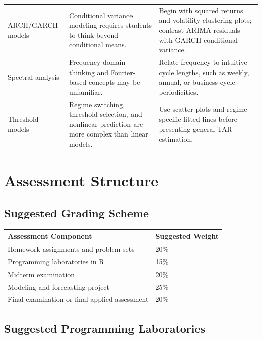 \documentclass[11pt]{article}
\begin{document}
\begin{longtable}{p{} p{} p{}}
ARCH/GARCH models & Conditional variance modeling requires students to think beyond conditional means. & Begin with squared returns and volatility clustering plots; contrast ARIMA residuals with GARCH conditional variance. \\

Spectral analysis & Frequency-domain thinking and Fourier-based concepts may be unfamiliar. & Relate frequency to intuitive cycle lengths, such as weekly, annual, or business-cycle periodicities. \\

Threshold models & Regime switching, threshold selection, and nonlinear prediction are more complex than linear models. & Use scatter plots and regime-specific fitted lines before presenting general TAR estimation. \\

\bottomrule
\end{longtable}

\section{Assessment Structure}

\subsection{Suggested Grading Scheme}

\begin{longtable}{p{} p{}}
\toprule
\textbf{Assessment Component} & \textbf{Suggested Weight} \\
\midrule
Homework assignments and problem sets & 20\% \\
Programming laboratories in R & 15\% \\
Midterm examination & 20\% \\
Modeling and forecasting project & 25\% \\
Final examination or final applied assessment & 20\% \\
\bottomrule
\end{longtable}

\subsection{Suggested Programming Laboratories}
\end{document}
